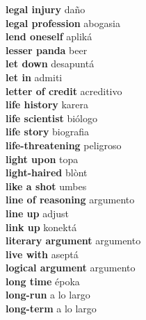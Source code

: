 \textbf{ legal injury  } daño \\
\textbf{ legal profession  } abogasia \\
\textbf{ lend oneself  } apliká \\
\textbf{ lesser panda  } beer \\
\textbf{ let down  } desapuntá \\
\textbf{ let in  } admiti \\
\textbf{ letter of credit  } acreditivo \\
\textbf{ life history  } karera \\
\textbf{ life scientist  } biólogo \\
\textbf{ life story  } biografia \\
\textbf{ life-threatening  } peligroso \\
\textbf{ light upon  } topa \\
\textbf{ light-haired  } blònt \\
\textbf{ like a shot  } umbes \\
\textbf{ line of reasoning  } argumento \\
\textbf{ line up  } adjust \\
\textbf{ link up  } konektá \\
\textbf{ literary argument  } argumento \\
\textbf{ live with  } aseptá \\
\textbf{ logical argument  } argumento \\
\textbf{ long time  } époka \\
\textbf{ long-run  } a lo largo \\
\textbf{ long-term  } a lo largo \\
